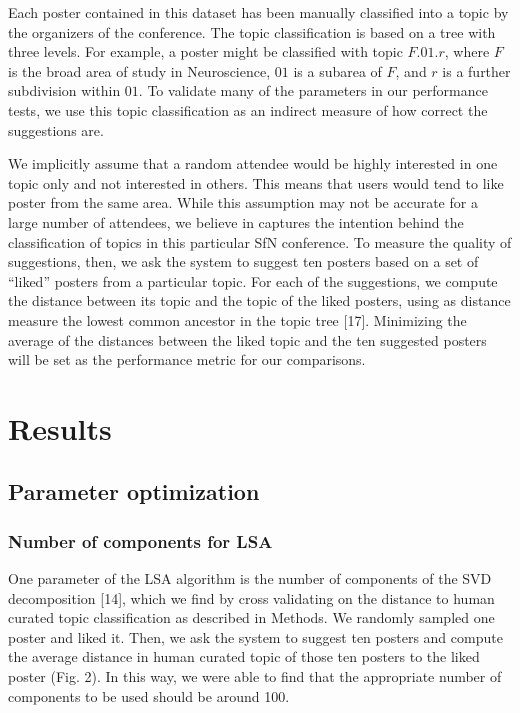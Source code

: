 \documentclass[a4paper]{article}
\begin{document}
Each poster contained in this dataset has been manually classified into a topic by the organizers of the conference. The topic classification is based on a tree with three levels. For example, a poster might be classified with topic $F.01.r$, where $F$ is the broad area of study in Neuroscience, $01$ is a subarea of $F$, and $r$ is a further subdivision within $01$.  To validate many of the parameters in our performance tests, we use this topic classification as an indirect measure of how correct the suggestions are.

We implicitly assume that a random attendee would be highly interested in one topic only and not interested in others. This means that users would tend to like poster from the same area. While this assumption may not be accurate for a large number of attendees, we believe in captures the intention behind the classification of topics in this particular SfN conference. To measure the quality of suggestions, then, we ask the system to suggest ten posters based on a set of “liked” posters from a particular topic. For each of the suggestions, we compute the distance between its topic and the topic of the liked posters, using as distance measure the lowest common ancestor in the topic tree [17]. Minimizing the average of the distances between the liked topic and the ten suggested posters will be set as the performance metric for our comparisons.

\section{Results}

\subsection{Parameter optimization}

\subsubsection*{Number of components for LSA}

One parameter of the LSA algorithm is the number of components of the SVD decomposition [14], which we find by cross validating on the distance to human curated topic classification as described in Methods. We randomly sampled one poster and liked it. Then, we ask the system to suggest ten posters and compute the average distance in human curated topic of those ten posters to the liked poster (Fig. 2). In this way, we were able to find that the appropriate number of components to be used should be around 100.
\end{document}

